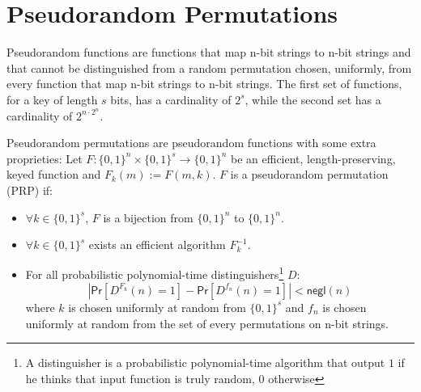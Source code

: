 \section{Pseudorandom Permutations}
Pseudorandom functions are functions that map n-bit strings to n-bit strings and that cannot be distinguished from a random permutation chosen, uniformly, from every function that map n-bit strings to n-bit strings.
The first set of functions, for a key of length $s$ bits, has a cardinality of $2^{s}$, while the second set has a cardinality of $2^{n\cdot2^n}$.\par
Pseudorandom permutations are pseudorandom functions with some extra proprieties:
Let $F : \{0,1\}^{n} \times \{0,1\}^{s} \rightarrow \{0,1\}^{n}$ be an efficient, length-preserving, keyed function and $F_k(m) := F(m, k)$.
$F$ is a pseudorandom permutation (PRP) if:
\begin{itemize}
    \item{$\forall k \in \{0,1\}^{s}$, $F$ is a bijection from $\{0,1\}^{n}$ to $\{0,1\}^{n}$}.
    \item{$\forall k \in \{0,1\}^{s}$ exists an efficient algorithm $F^{-1}_k$.}
    \item{For all probabilistic polynomial-time distinguishers\footnote{A distinguisher is a probabilistic polynomial-time algorithm that output $1$ if he thinks that input function is truly random, $0$ otherwise} $D$:
        $$
            |\mathsf{Pr}[D^{F_k}(n) = 1] - \mathsf{Pr}[D^{f_n}(n) = 1]| < \mathsf{negl}(n)
        $$
        where $k$ is chosen uniformly at random from $\{0,1\}^{s}$ and $f_n$ is chosen uniformly at random from the set of every permutations on n-bit strings.
        }
\end{itemize}

